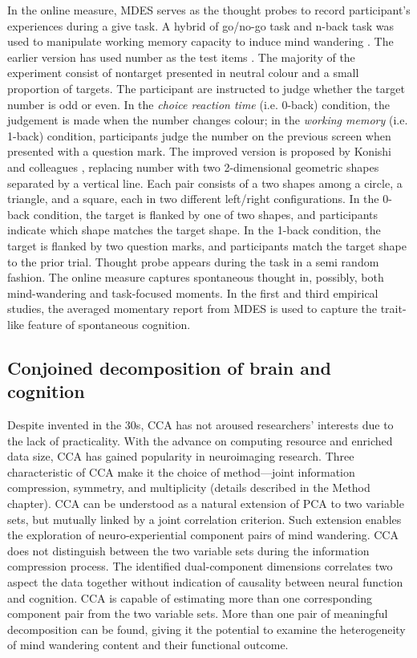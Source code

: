 In the online measure, MDES serves as the thought probes to record participant's experiences during a give task. A hybrid of go/no-go task and n-back task was used to manipulate working memory capacity to induce mind wandering \cite{Konishi2015, Medea2016}. The earlier version has used number as the test items \cite{SmallwoodNI2013,SmallwoodPlos2011}. The majority of the experiment consist of nontarget presented in neutral colour and a small proportion of targets. The participant are instructed to judge whether the target number is odd or even. In the \textit{choice reaction time} (i.e. 0-back) condition, the judgement is made when the number changes colour; in the \textit{working memory} (i.e. 1-back) condition, participants judge the number on the previous screen when presented with a question mark. The improved version is proposed by Konishi and colleagues \citeyear{Konishi2015}, replacing number with two 2-dimensional geometric shapes separated by a vertical line. Each pair consists of a two shapes among a circle, a triangle, and a square, each in two different left/right configurations. In the 0-back condition, the target is flanked by one of two shapes, and participants indicate which shape matches the target shape. In the 1-back condition, the target is flanked by two question marks, and participants match the target shape to the prior trial. Thought probe appears during the task in a semi random fashion. The online measure captures spontaneous thought in, possibly, both mind-wandering and task-focused moments. In the first and third empirical studies, the averaged momentary report from MDES is used to capture the trait-like feature of spontaneous cognition.

\subsection{Conjoined decomposition of brain and cognition}

Despite invented in the 30s, CCA has not aroused researchers’ interests due to the lack of practicality. With the advance on computing resource and enriched data size, CCA has gained popularity in neuroimaging research. Three characteristic of CCA make it the choice of method---joint information compression, symmetry, and multiplicity (details described in the Method chapter). CCA can be understood as a natural extension of PCA to two variable sets, but mutually linked by a joint correlation criterion. Such extension enables the exploration of neuro-experiential component pairs of mind wandering. CCA does not distinguish between the two variable sets during the information compression process. The identified dual-component dimensions correlates two aspect the data together without indication of causality between neural function and cognition. CCA is capable of estimating more than one corresponding component pair from the two variable sets. More than one pair of meaningful decomposition can be found, giving it the potential to examine the heterogeneity of mind wandering content and their functional outcome. 


